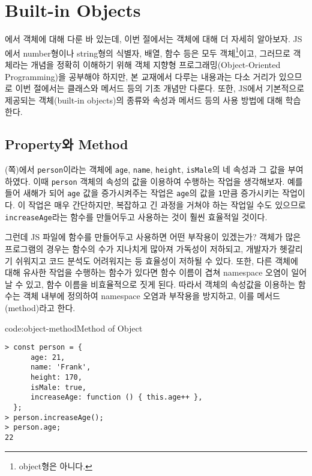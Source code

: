 \section{Built-in Objects} \label{sect:built-in-objects}

에서 객체에 대해 다룬 바 있는데, 이번 절에서는 객체에 대해 더 자세히 알아보자. JS에서 number형이나 string형의 식별자, 배열, 함수 등은 모두 객체\footnote{object형은 아니다.}이고, 그러므로 객체라는 개념을 정확히 이해하기 위해 객체 지향형 프로그래밍(Object-Oriented Programming)을 공부해야 하지만, 본 교재에서 다루는 내용과는 다소 거리가 있으므로 이번 절에서는 클래스와 메서드 등의 기초 개념만 다룬다. 또한, JS에서 기본적으로 제공되는 객체(built-in objects)의 종류와 속성과 메서드 등의 사용 방법에 대해 학습한다.

\subsection*{Property와 Method}

(\pageref{code:object-type}쪽)에서 \texttt{person}이라는 객체에 \texttt{age}, \texttt{name}, \texttt{height}, \texttt{isMale}의 네 속성과 그 값을 부여하였다. 이때 \texttt{person} 객체의 속성의 값을 이용하여 수행하는 작업을 생각해보자. 예를 들어 새해가 되어 \texttt{age} 값을 증가시켜주는 작업은 \texttt{age}의 값을 \texttt{1}만큼 증가시키는 작업이다. 이 작업은 매우 간단하지만, 복잡하고 긴 과정을 거쳐야 하는 작업일 수도 있으므로 \texttt{increaseAge}라는 함수를 만들어두고 사용하는 것이 훨씬 효율적일 것이다.

그런데 JS 파일에 함수를 만들어두고 사용하면 어떤 부작용이 있겠는가? 객체가 많은 프로그램의 경우는 함수의 수가 지나치게 많아져 가독성이 저하되고, 개발자가 헷갈리기 쉬워지고 코드 분석도 어려워지는 등 효율성이 저하될 수 있다. 또한, 다른 객체에 대해 유사한 작업을 수행하는 함수가 있다면 함수 이름이 겹쳐 namespace 오염이 일어날 수 있고, 함수 이름을 비효율적으로 짓게 된다. 따라서 객체의 속성값을 이용하는 함수는 객체 내부에 정의하여 namespace 오염과 부작용을 방지하고, 이를 메서드(method)라고 한다.

\begin{codeenv}{code:object-method}{Method of Object}\begin{verbatim}
> const person = {
      age: 21,
      name: 'Frank',
      height: 170,
      isMale: true,
      increaseAge: function () { this.age++ },
  };
> person.increaseAge();
> person.age;
22
\end{verbatim}
\end{codeenv}

